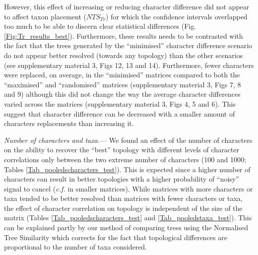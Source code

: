 \documentclass[12pt,letterpaper]{article}
\renewcommand{\subsubsection}[1]{%
\vspace{2ex}
\noindent
\textit{#1.}---}
\begin{document}
However, this effect of increasing or reducing character difference did not appear to affect taxon placement ($NTS_{Tr}$) for which the confidence intervals overlapped too much to be able to discern clear statistical differences (Fig.\ref{Fig:Tr_results_best}).
Furthermore, these results needs to be contrasted with the fact that the trees generated by the ``minimised'' character difference scenario do not appear better resolved (towards any topology) than the other scenarios (see supplementary material 3, Figs 12, 13 and 14).
Furthermore, fewer characters were replaced, on average, in the ``minimised'' matrices compared to both the ``maximised'' and ``randomised'' matrices (supplementary material 3, Figs 7, 8 and 9) although this did not change the way the average character differences varied across the matrices (supplementary material 3, Figs 4, 5 and 6).
This suggest that character difference can be decreased with a smaller amount of characters replacements than increasing it.

\subsubsection{Number of characters and taxa}
We found an effect of the number of characters on the ability to recover the ``best'' topology with different levels of character correlations only between the two extreme number of characters (100 and 1000; Tables \ref{Tab_pooledscharacters_test}).
This is expected since a higher number of characters can result in better topologies with a higher probability of ``noisy'' signal to cancel (\textit{c.f.} in smaller matrices).
While matrices with more characters or taxa tended to be better resolved than matrices with fewer characters or taxa, the effect of character correlation on topology is independent of the size of the matrix (Tables \ref{Tab_pooledscharacters_test} and \ref{Tab_pooledstaxa_test}).
This can be explained partly by our method of comparing trees using the Normalised Tree Similarity \citep[$NTS$;][]{Bogdanowicz2012} which corrects for the fact that topological differences are proportional to the number of taxa considered.
\end{document}
